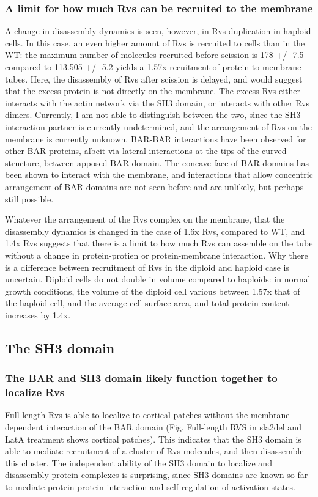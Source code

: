 \subsubsection{A limit for how much Rvs can be recruited to the membrane}
A change in disassembly dynamics is seen, however, in Rvs duplication in haploid cells. In this case, an even higher amount of Rvs is recruited to cells than in the WT: the maximum number of molecules recruited before scission is 178 +/- 7.5 compared to 113.505 +/- 5.2 yields a 1.57x recuitment of protein to membrane tubes. Here, the disassembly of Rvs after scission is delayed, and would suggest that the excess protein is not directly on the membrane. The excess Rvs either interacts with the actin network via the SH3 domain, or interacts with other Rvs dimers. Currently, I am not able to distinguish between the two, since the SH3 interaction partner is currently undetermined, and the arrangement of Rvs on the membrane is currently unknown. BAR-BAR interactions have been observed for other BAR proteins, albeit via lateral interactions at the tips of the curved structure, between apposed BAR domain. The concave face of BAR domains has been shown to interact with the membrane, and interactions that allow concentric arrangement of BAR domains are not seen before and are unlikely, but perhaps still possible.

Whatever the arrangement of the Rvs complex on the membrane, that the disassembly dynamics is changed in the case of 1.6x Rvs, compared to WT, and 1.4x Rvs suggests that there is a limit to how much Rvs can assemble on the tube without a change in protein-protien or protein-membrane interaction. Why there is a difference between recruitment of Rvs in the diploid and haploid case is uncertain. Diploid cells do not double in volume compared to haploids: in normal growth conditions, the volume of the diploid cell various between 1.57x that of the haploid cell, and the average cell surface area, and total protein content increases by 1.4x. 

\subsection{The SH3 domain}

	
\subsubsection{The BAR and SH3 domain likely function together to localize Rvs}
Full-length Rvs is able to localize to cortical patches without the membrane-dependent interaction of the BAR domain (Fig. Full-length RVS in sla2del and LatA treatment shows cortical patches). This indicates that the SH3 domain is able to mediate recruitment of a cluster of Rvs molecules, and then disassemble this cluster.  The independent ability of the SH3 domain to localize and disassembly protein complexes is surprising, since SH3 domains are known so far to mediate protein-protein interaction and self-regulation of activation states. 

